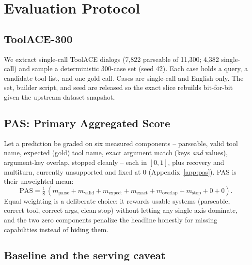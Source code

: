 \documentclass[11pt]{article}
\begin{document}
\section{Evaluation Protocol}
\label{sec:eval}

\subsection{ToolACE-300}
\label{sec:dataset}

We extract single-call ToolACE dialogs (7,822 parseable of 11,300; 4,382
single-call) and sample a deterministic 300-case set (seed 42). Each case holds
a query, a candidate tool list, and one gold call. Cases are single-call and
English only. The set, builder script, and seed are released so the exact slice
rebuilds bit-for-bit given the upstream dataset snapshot.

\subsection{PAS: Primary Aggregated Score}
\label{sec:pas}

Let a prediction be graded on six measured components -- parseable, valid tool
name, expected (gold) tool name, exact argument match (keys \emph{and} values),
argument-key overlap, stopped cleanly -- each in $[0,1]$, plus recovery and
multiturn, currently unsupported and fixed at 0 (Appendix~\ref{app:pas}). PAS is
their unweighted mean:
\begin{equation}
  \mathrm{PAS} = \tfrac{1}{8}\,
  (m_{\mathrm{parse}} + m_{\mathrm{valid}} + m_{\mathrm{expect}}
  + m_{\mathrm{exact}} + m_{\mathrm{overlap}} + m_{\mathrm{stop}} + 0 + 0).
  \label{eq:pas}
\end{equation}
Equal weighting is a deliberate choice: it rewards usable systems (parseable,
correct tool, correct args, clean stop) without letting any single axis
dominate, and the two zero components penalize the headline honestly for missing
capabilities instead of hiding them.

\subsection{Baseline and the serving caveat}
\label{sec:baseline}
\end{document}
